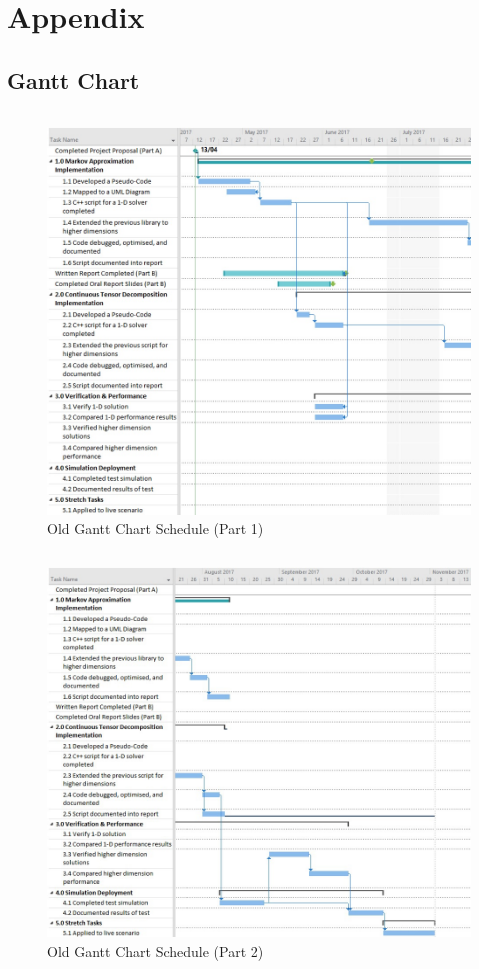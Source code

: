 \documentclass[11pt,draftd]{article}
\begin{document}
\section{Appendix}
\begin{appendices}
	\section{Gantt Chart}\label{app_itemA}
	\[\]
	\[\]
	\[\]
	\begin{figure}[h]
		\centering
		\includegraphics[scale=.6]{OldGanttPart1}
		\caption{Old Gantt Chart Schedule (Part 1)}
	\end{figure}
	\newpage
	\[\]
	\[\]
	\[\]
	\begin{figure}[h]
		\centering
		\includegraphics[scale=.6]{OldGanttPart2}
		\caption{Old Gantt Chart Schedule (Part 2)}
	\end{figure}
	\newpage

\end{appendices}
\end{document}
